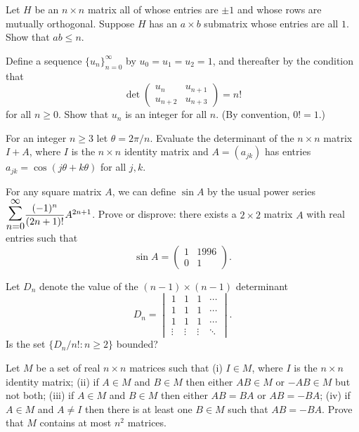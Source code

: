 \documentclass[12pt]{article}
\let\oldsum\sum
\renewcommand{\sum}{\mathlarger{\mathlarger{\oldsum}}}
\begin{document}
\begin{problem}
Let $H$ be an $n\times n$ matrix all of whose entries are $\pm 1$ and whose rows are mutually orthogonal. Suppose $H$ has an $a\times b$ submatrix whose entries are all $1$. Show that $ab\le n$.
\end{problem}

\begin{problem}
Define a sequence $\{u_n\}_{n=0}^\infty$ by $u_0=u_1=u_2=1$, and thereafter by the condition that
\[
\det\begin{pmatrix}u_n & u_{n+1}\\ u_{n+2} & u_{n+3}\end{pmatrix} = n!
\]
for all $n\ge 0$. Show that $u_n$ is an integer for all $n$. (By convention, $0!=1$.)
\end{problem}

\begin{problem}
For an integer $n\ge 3$ let $\theta=2\pi/n$. Evaluate the determinant of the $n\times n$ matrix $I+A$, where $I$ is the $n\times n$ identity matrix and $A=(a_{jk})$ has entries $a_{jk} = \cos(j\theta+k\theta)$ for all $j,k$.
\end{problem}

\begin{problem}
For any square matrix $A$, we can define $\sin A$ by the usual power series $\sum_{n=0}^\infty \dfrac{(-1)^n}{(2n+1)!}A^{2n+1}$. Prove or disprove: there exists a $2\times 2$ matrix $A$ with real entries such that
\[
\sin A = \begin{pmatrix}1 & 1996\\ 0 & 1\end{pmatrix}.
\]
\end{problem}

\begin{problem}
Let $D_n$ denote the value of the $(n-1)\times(n-1)$ determinant
\[
D_n = \begin{vmatrix} 1 & 1 & 1 & \cdots\\ 1 & 1 & 1 & \cdots\\ 1 & 1 & 1 & \cdots\\ \vdots & \vdots & \vdots & \ddots\end{vmatrix}.
\]
Is the set $\{D_n/n! : n\ge 2\}$ bounded?
\end{problem}

\begin{problem}
Let $M$ be a set of real $n\times n$ matrices such that (i) $I\in M$, where $I$ is the $n\times n$ identity matrix; (ii) if $A\in M$ and $B\in M$ then either $AB\in M$ or $-AB\in M$ but not both; (iii) if $A\in M$ and $B\in M$ then either $AB=BA$ or $AB=-BA$; (iv) if $A\in M$ and $A\ne I$ then there is at least one $B\in M$ such that $AB=-BA$. Prove that $M$ contains at most $n^2$ matrices.
\end{problem}
\end{document}
